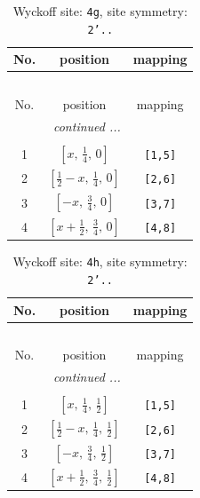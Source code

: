 \documentclass[fleqn,8pt]{jsarticle}
\begin{document}
\renewcommand{\arraystretch}{1.2}
\begin{longtable}{ccc}
\caption{Wyckoff site: {\tt 4g}, site symmetry: {\tt 2'..}}
 \\
 \hline \hline
No. & position & mapping \\ \hline \endfirsthead

\multicolumn{2}{l}{\tablename\ \thetable{}} \\
 \hline \hline
No. & position & mapping \\ \hline \endhead

 \hline \hline
\multicolumn{2}{r}{\footnotesize\it continued ...} \\ \endfoot

 \hline \hline
\multicolumn{2}{r}{} \\ \endlastfoot

1 & $\left[ x,\, \frac{1}{4},\, 0 \right]$ & {\tt [1,5]} \\ \hline
2 & $\left[ \frac{1}{2} - x,\, \frac{1}{4},\, 0 \right]$ & {\tt [2,6]} \\ \hline
3 & $\left[ - x,\, \frac{3}{4},\, 0 \right]$ & {\tt [3,7]} \\ \hline
4 & $\left[ x + \frac{1}{2},\, \frac{3}{4},\, 0 \right]$ & {\tt [4,8]} \\
\end{longtable}
\renewcommand{\arraystretch}{1.2}
\begin{longtable}{ccc}
\caption{Wyckoff site: {\tt 4h}, site symmetry: {\tt 2'..}}
 \\
 \hline \hline
No. & position & mapping \\ \hline \endfirsthead

\multicolumn{2}{l}{\tablename\ \thetable{}} \\
 \hline \hline
No. & position & mapping \\ \hline \endhead

 \hline \hline
\multicolumn{2}{r}{\footnotesize\it continued ...} \\ \endfoot

 \hline \hline
\multicolumn{2}{r}{} \\ \endlastfoot

1 & $\left[ x,\, \frac{1}{4},\, \frac{1}{2} \right]$ & {\tt [1,5]} \\ \hline
2 & $\left[ \frac{1}{2} - x,\, \frac{1}{4},\, \frac{1}{2} \right]$ & {\tt [2,6]} \\ \hline
3 & $\left[ - x,\, \frac{3}{4},\, \frac{1}{2} \right]$ & {\tt [3,7]} \\ \hline
4 & $\left[ x + \frac{1}{2},\, \frac{3}{4},\, \frac{1}{2} \right]$ & {\tt [4,8]} \\
\end{longtable}
\end{document}
